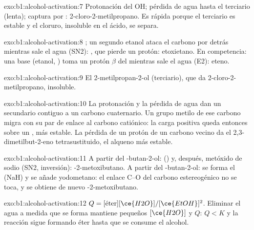 \begin{solution}{exo:b1:alcohol-activation:7}
Protonación del OH; pérdida de agua hasta el  terciario
(lenta); captura por : 2-cloro-2-metilpropano. Es rápida porque el
 terciario es estable y el cloruro, insoluble en el ácido, se
separa.
\end{solution}

\begin{solution}{exo:b1:alcohol-activation:8}
; un segundo etanol ataca el carbono por
detrás mientras sale el agua (SN2): , que pierde un
protón: etoxietano. En competencia: una base (etanol, ) toma un
protón $\beta$ del  mientras sale el agua (E2): eteno.
\end{solution}

\begin{solution}{exo:b1:alcohol-activation:9}
El 2-metilpropan-2-ol (terciario), que da 2-cloro-2-metilpropano,
insoluble.
\end{solution}

\begin{solution}{exo:b1:alcohol-activation:10}
La protonación y la pérdida de agua dan un  secundario contiguo
a un carbono cuaternario. Un grupo metilo de ese carbono migra con su par
de enlace al carbono catiónico: la carga positiva queda entonces sobre un
, más estable. La pérdida de un protón de un carbono
vecino da el 2,3-dimetilbut-2-eno tetrasustituido, el alqueno más
estable.
\end{solution}

\begin{solution}{exo:b1:alcohol-activation:11}
A partir del -butan-2-ol:  () y, después, metóxido
de sodio (SN2, inversión): -2-metoxibutano. A partir del
-butan-2-ol: se forma el  (NaH) y se añade yodometano: el
enlace C--O del carbono estereogénico no se toca, y se obtiene de nuevo
-2-metoxibutano.
\end{solution}

\begin{solution}{exo:b1:alcohol-activation:12}
$Q = [\text{éter}][\ce{H2O}]/[\ce{EtOH}]^2$. Eliminar el agua a medida que
se forma mantiene pequeños $[\ce{H2O}]$ y $Q$: $Q < K$ y la reacción sigue
formando éter hasta que se consume el alcohol.
\end{solution}

